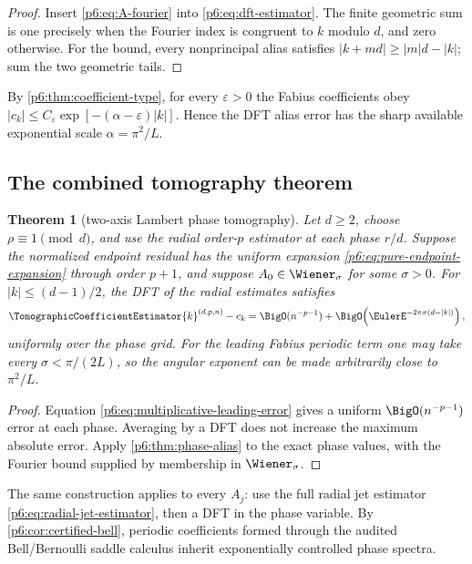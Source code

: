 \documentclass[11pt]{article}
\numberwithin{equation}{section}
\newtheorem{theorem}{Theorem}[section]
\theoremstyle{definition}
\theoremstyle{remark}
\begin{document}
\begin{proof}
Insert \eqref{p6:eq:A-fourier} into \eqref{p6:eq:dft-estimator}.  The finite geometric
sum is one precisely when the Fourier index is congruent to $k$ modulo $d$, and zero
otherwise.  For the bound, every nonprincipal alias satisfies
$|k+md|\ge |m|d-|k|$; sum the two geometric tails.
\end{proof}

By \cref{p6:thm:coefficient-type}, for every $\varepsilon>0$ the Fabius coefficients obey
$|c_k|\le C_\varepsilon\exp[-(\alpha-\varepsilon)|k|]$.  Hence the DFT alias error has the
sharp available exponential scale $\alpha=\pi^2/L$.

\subsection{The combined tomography theorem}

\begin{theorem}[two-axis Lambert phase tomography]
\label{p6:thm:two-axis}
Let $d\ge2$, choose $\rho\equiv1\pmod d$, and use the radial order-$p$ estimator at each
phase $r/d$.  Suppose the normalized endpoint residual has the uniform expansion
\eqref{p6:eq:pure-endpoint-expansion} through order $p+1$, and suppose
$A_0\in\Wiener_\sigma$ for some $\sigma>0$.  For
$|k|\le(d-1)/2$, the DFT of the radial estimates satisfies
\begin{equation}
 \TomographicCoefficientEstimator{k}^{(d,p,n)}-c_k
 =\BigO(n^{-p-1})
 +\BigO\!\left(\EulerE^{-2\pi\sigma(d-|k|)}\right),
 \label{p6:eq:two-axis-error}
\end{equation}
uniformly over the phase grid.  For the leading Fabius periodic term one may take every
$\sigma<\pi/(2L)$, so the angular exponent can be made arbitrarily close to
$\pi^2/L$.
\end{theorem}

\begin{proof}
Equation \eqref{p6:eq:multiplicative-leading-error} gives a uniform
$\BigO(n^{-p-1})$ error at each phase.  Averaging by a DFT does not increase the maximum
absolute error.  Apply \cref{p6:thm:phase-alias} to the exact phase values, with the Fourier
bound supplied by membership in $\Wiener_\sigma$.
\end{proof}

The same construction applies to every $A_j$: use the full radial jet estimator
\eqref{p6:eq:radial-jet-estimator}, then a DFT in the phase variable.  By
\cref{p6:cor:certified-bell}, periodic coefficients formed through the audited
Bell/Bernoulli saddle calculus inherit exponentially controlled phase spectra.
\end{document}
